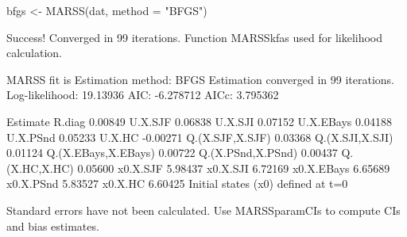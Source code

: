 \begin{Schunk}
\begin{Sinput}
 bfgs <- MARSS(dat, method = "BFGS")
\end{Sinput}
\begin{Soutput}
Success! Converged in 99 iterations.
Function MARSSkfas used for likelihood calculation.

MARSS fit is
Estimation method: BFGS 
Estimation converged in 99 iterations. 
Log-likelihood: 19.13936 
AIC: -6.278712   AICc: 3.795362   
 
                    Estimate
R.diag               0.00849
U.X.SJF              0.06838
U.X.SJI              0.07152
U.X.EBays            0.04188
U.X.PSnd             0.05233
U.X.HC              -0.00271
Q.(X.SJF,X.SJF)      0.03368
Q.(X.SJI,X.SJI)      0.01124
Q.(X.EBays,X.EBays)  0.00722
Q.(X.PSnd,X.PSnd)    0.00437
Q.(X.HC,X.HC)        0.05600
x0.X.SJF             5.98437
x0.X.SJI             6.72169
x0.X.EBays           6.65689
x0.X.PSnd            5.83527
x0.X.HC              6.60425
Initial states (x0) defined at t=0

Standard errors have not been calculated. 
Use MARSSparamCIs to compute CIs and bias estimates.
\end{Soutput}
\end{Schunk}
